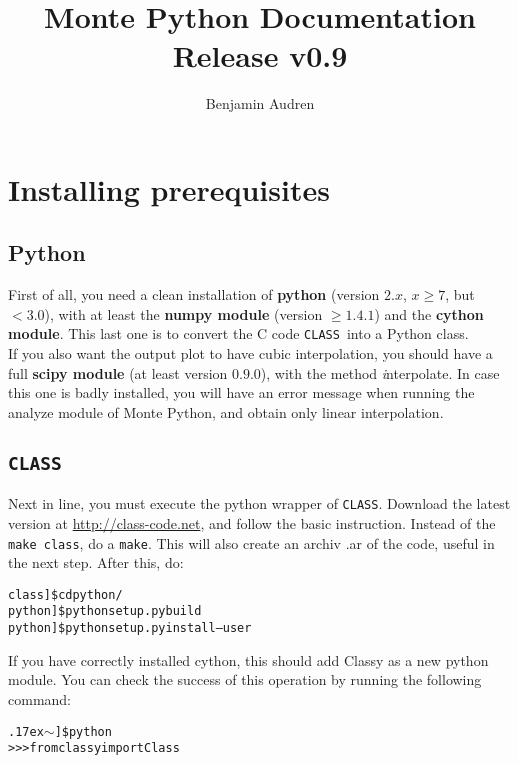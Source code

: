 \documentclass[10pt]{article}
\title{ {\huge \bf Monte Python Documentation}\\Release v0.9}
\author{Benjamin Audren}
\newcommand{\CLASS}{\texttt{CLASS}}
\newcommand{\tild}{\raise.17ex\hbox{$\scriptstyle\mathtt{\sim}$}}
\begin{document}
\maketitle

\newpage

\tableofcontents

\newpage

\section{Installing prerequisites}

  \subsection{Python}

  First of all, you need a clean installation of {\bf python} (version $2.x$,
  $x\geq7$, but $<3.0$), with at least the {\bf numpy module} (version
  $\geq1.4.1$) and the {\bf cython module}. This last one is to convert the C
  code \CLASS ~into a Python class.\\

  If you also want the output plot to have cubic interpolation, you should have a
  full {\bf scipy module} (at least version $0.9.0$), with the method {\emph
  interpolate}. In case this one is badly installed, you will have an error
  message when running the analyze module of Monte Python, and obtain only linear
  interpolation.

  \subsection{\CLASS}

  Next in line, you must execute the python wrapper of \CLASS. Download the
  latest version at \url{http://class-code.net}, and follow the basic
  instruction.  Instead of the \verb?make class?, do a \verb?make?. This will
  also create an archiv .ar of the code, useful in the next step. After this, do:

  \begin{alltt}
   class]\$ cd python/
   python]\$ python setup.py build
   python]\$ python setup.py install --user
  \end{alltt}

  If you have correctly installed cython, this should add Classy as a new python
  module. You can check the success of this operation by running the following
  command:

  \begin{alltt}
    \tild]\$ python
    >>> from classy import Class
  \end{alltt}
\end{document}
